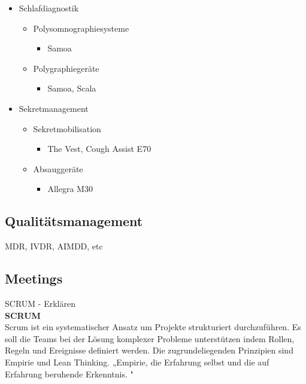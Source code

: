 \documentclass[a4paper, 12pt]{article}
\begin{document}
\begin{itemize}[noitemsep, topsep=0pt]
    \item Schlafdiagnostik
    \begin{itemize}[noitemsep, topsep=0pt]
        \item Polysomnographiesysteme
        \begin{itemize}[noitemsep, topsep=0pt]
            \item Samoa
        \end{itemize}
        \item Polygraphiegeräte
        \begin{itemize}[noitemsep, topsep=0pt]
            \item Samoa, Scala
        \end{itemize}
    \end{itemize}

    \item Sekretmanagement
    \begin{itemize}[noitemsep, topsep=0pt]
        \item Sekretmobilisation
        \begin{itemize}[noitemsep, topsep=0pt]
            \item The Vest, Cough Assist E70
        \end{itemize}
        \item Absauggeräte
        \begin{itemize}[noitemsep, topsep=0pt]
            \item Allegra M30
        \end{itemize}
    \end{itemize}
\end{itemize}



\subsection{Qualitätsmanagement}\label{Qualitätsmanagement}
MDR, IVDR, AIMDD, etc

\subsection{Meetings}\label{Meetings}
SCRUM - Erklären
\\ 
\textbf{SCRUM}\\
Scrum ist ein systematischer Ansatz um Projekte strukturiert durchzuführen. Es soll die Teams bei der Lösung komplexer Probleme unterstützen indem Rollen, Regeln und Ereignisse definiert werden. Die zugrundeliegenden Prinzipien sind Empirie und Lean Thinking. 
„Empirie, die Erfahrung selbst und die auf Erfahrung beruhende Erkenntnis.  
 \cite{dorsch_empirie}"
 
\end{document}
